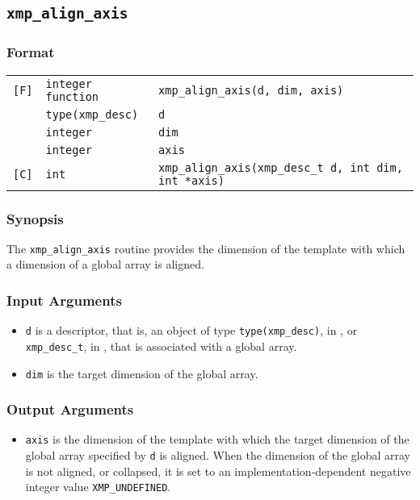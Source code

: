 \subsection{\tt xmp\_align\_axis}

\subsubsection*{Format}

\begin{tabular}{lll}

\verb![F]!& {\tt integer function}& {\tt xmp\_align\_axis(d, dim, axis)}\\
          & {\tt type(xmp\_desc)} & {\tt d}\\
          & {\tt integer} & {\tt dim}\\
          & {\tt integer} & {\tt axis}\\

\verb![C]!&  {\tt int}& {\tt xmp\_align\_axis(xmp\_desc\_t d, int dim, int *axis)}\\

\end{tabular}

\subsubsection*{Synopsis}

The {\tt xmp\_align\_axis} routine provides the dimension of the
template with which a dimension of a global array is aligned.

\subsubsection*{Input Arguments}
\begin{itemize}
 \item {\tt d} is a descriptor, that is, an object of type 
       {\tt type(xmp\_desc)}, in {\XMPF}, or {\tt xmp\_desc\_t},
       in {\XMPC}, that is associated with a global array.
 \item {\tt dim} is the target dimension of the global array.
\end{itemize}

\subsubsection*{Output Arguments}
\begin{itemize}
 \item {\tt axis} is the dimension of the template with which the target
       dimension of the global array specified by {\tt d} is
       aligned. When the dimension of the global array is not aligned,
       or collapsed, it is set to an implementation-dependent negative
       integer value {\tt XMP\_UNDEFINED}.


\end{itemize}


